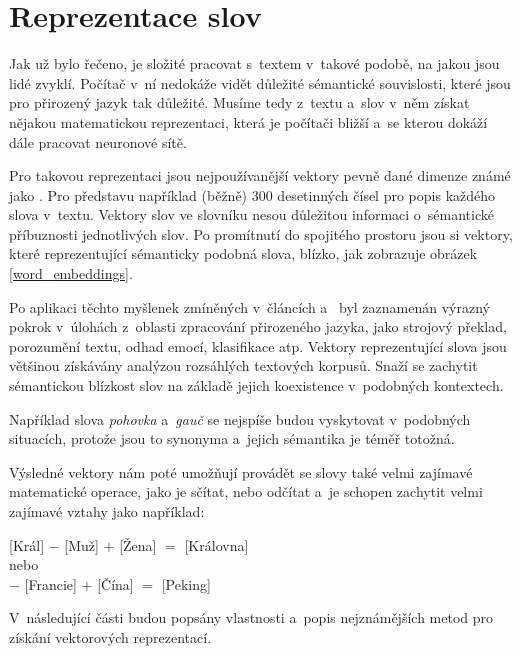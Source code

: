\section{Reprezentace slov}
\label{reprezentace_slov}
Jak už bylo řečeno, je složité pracovat s~textem v~takové podobě, na jakou jsou lidé zvyklí. Počítač v~ní nedokáže vidět důležité sémantické souvislosti, které jsou pro přirozený jazyk tak důležité. Musíme tedy z~textu a~slov v~něm získat nějakou matematickou reprezentaci, která je počítači bližší a~se kterou dokáží dále pracovat neuronové sítě. \par
Pro takovou reprezentaci jsou nejpoužívanější vektory pevně dané dimenze známé jako . Pro představu například (běžně) 300 desetinných čísel pro popis každého slova v~textu. Vektory slov ve slovníku nesou důležitou informaci o~sémantické příbuznosti jednotlivých slov. Po promítnutí do spojitého prostoru jsou si vektory, které reprezentující sémanticky podobná slova, blízko, jak zobrazuje obrázek \ref{word_embeddings}.\par
Po aplikaci těchto myšlenek zmíněných v~článcích \cite{mikolov2013embeddings} a~\cite{mikolov2013_2} byl zaznamenán výrazný pokrok v~úlohách z~oblasti zpracování přirozeného jazyka, jako strojový překlad, porozumění textu, odhad emocí, klasifikace atp.
Vektory reprezentující slova jsou většinou získávány analýzou rozsáhlých textových korpusů. Snaží se zachytit sémantickou blízkost slov na základě jejich koexistence v~podobných kontextech.\par 
Například slova \emph{pohovka} a~\emph{gauč} se nejspíše budou vyskytovat v~podobných situacích, protože jsou to synonyma a~jejich sémantika je téměř totožná.\par
Výsledné vektory nám poté umožňují provádět se slovy také velmi zajímavé matematické operace, jako je sčítat, nebo odčítat a~je schopen zachytit velmi zajímavé vztahy jako například:
\begin{center}
[Král] $-$ [Muž] $+$ [Žena] $=$ [Královna]\\
\medskip
nebo\\
\medskip
[Paříž] $-$ [Francie] $+$ [Čína] $=$ [Peking]
\end{center}

V~následující části budou popsány vlastnosti a~popis nejznámějších metod pro získání vektorových reprezentací.

